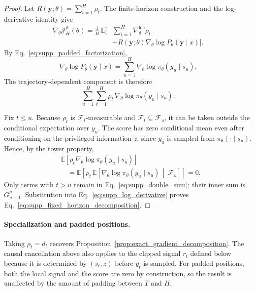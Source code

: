 \documentclass[letterpaper]{article} %
\begin{document}
\begin{proof}
Let $R(\mathbf y;\theta)=\sum_{t=1}^{H}\rho_t$. The finite-horizon
construction and the log-derivative identity give
\begin{equation}
\begin{split}
    \nabla_\theta\mathcal J_H^\rho(\theta)
    =
    \frac{1}{H}\,
    \mathbb E\Bigg[
        &\sum_{t=1}^{H}\nabla_\theta^{\mathrm{loc}}\rho_t\\
        &+
        R(\mathbf y;\theta)
        \nabla_\theta\log P_\theta(\mathbf y\mid x)
    \Bigg].
    \label{eq:supp_log_derivative}
\end{split}
\end{equation}
By Eq.~\eqref{eq:supp_padded_factorization},
\begin{equation}
    \nabla_\theta\log P_\theta(\mathbf y\mid x)
    =
    \sum_{u=1}^{H}
    \nabla_\theta\log\pi_\theta(y_u\mid s_u).
\end{equation}
The trajectory-dependent component is therefore
\begin{equation}
    \sum_{u=1}^{H}\sum_{t=1}^{H}
    \rho_t\,
    \nabla_\theta\log\pi_\theta(y_u\mid s_u).
    \label{eq:supp_double_sum}
\end{equation}

Fix $t\leq u$. Because $\rho_t$ is $\mathcal F_t$-measurable and
$\mathcal F_t\subseteq\mathcal F_u$, it can be taken outside the
conditional expectation over $y_u$. The score has zero conditional
mean even after conditioning on the privileged information $z$, since
$y_u$ is sampled from $\pi_\theta(\cdot\mid s_u)$. Hence, by the tower
property,
\begin{equation}
\begin{split}
    &\mathbb E\!\left[
        \rho_t
        \nabla_\theta\log\pi_\theta(y_u\mid s_u)
    \right]\\
    &\quad=
    \mathbb E\!\left[
        \rho_t\,
        \mathbb E\!\left[
            \nabla_\theta\log\pi_\theta(y_u\mid s_u)
            \,\middle|\,
            \mathcal F_u
        \right]
    \right]
    =0.
    \label{eq:supp_score_cancellation}
\end{split}
\end{equation}
Only terms with $t>u$ remain in
Eq.~\eqref{eq:supp_double_sum}; their inner sum is
$G^\rho_{u+1}$. Substitution into
Eq.~\eqref{eq:supp_log_derivative} proves
Eq.~\eqref{eq:supp_fixed_horizon_decomposition}.
\end{proof}

\paragraph{Specialization and padded positions.}
Taking $\rho_t=d_t$ recovers Proposition~\ref{prop:exact_gradient_decomposition}. The
causal cancellation above also applies to the clipped signal $r_t$
defined below because it is determined by $(s_t,z)$ before $y_t$ is
sampled. For padded positions, both the local signal and the score are
zero by construction, so the result is unaffected by the amount of
padding between $T$ and $H$.
\end{document}
